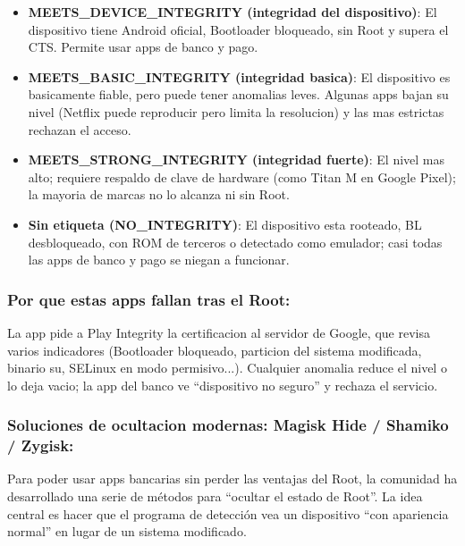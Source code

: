 \begin{itemize}
  \item \textbf{MEETS\_DEVICE\_INTEGRITY (integridad del dispositivo)}: El dispositivo tiene Android oficial, Bootloader bloqueado, sin Root y supera el CTS. Permite usar apps de banco y pago.
  \item \textbf{MEETS\_BASIC\_INTEGRITY (integridad basica)}: El dispositivo es basicamente fiable, pero puede tener anomalias leves. Algunas apps bajan su nivel (Netflix puede reproducir pero limita la resolucion) y las mas estrictas rechazan el acceso.
  \item \textbf{MEETS\_STRONG\_INTEGRITY (integridad fuerte)}: El nivel mas alto; requiere respaldo de clave de hardware (como Titan M en Google Pixel); la mayoria de marcas no lo alcanza ni sin Root.
  \item \textbf{Sin etiqueta (NO\_INTEGRITY)}: El dispositivo esta rooteado, BL desbloqueado, con ROM de terceros o detectado como emulador; casi todas las apps de banco y pago se niegan a funcionar.
\end{itemize}

\subsubsection*{Por que estas apps fallan tras el Root:}

La app pide a Play Integrity la certificacion al servidor de Google, que revisa varios indicadores (Bootloader bloqueado, particion del sistema modificada, binario su, SELinux en modo permisivo...). Cualquier anomalia reduce el nivel o lo deja vacio; la app del banco ve “dispositivo no seguro” y rechaza el servicio.

\subsubsection*{Soluciones de ocultacion modernas: Magisk Hide / Shamiko / Zygisk:}

Para poder usar apps bancarias sin perder las ventajas del Root, la comunidad ha desarrollado una serie de métodos para “ocultar el estado de Root”. La idea central es hacer que el programa de detección vea un dispositivo “con apariencia normal” en lugar de un sistema modificado.

